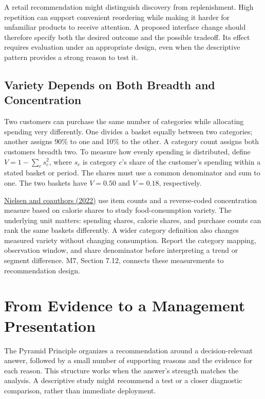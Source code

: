 A retail recommendation might distinguish discovery from replenishment.
High repetition can support convenient reordering while making it harder
for unfamiliar products to receive attention. A proposed interface
change should therefore specify both the desired outcome and the
possible tradeoff. Its effect requires evaluation under an appropriate
design, even when the descriptive pattern provides a strong reason to
test it.

\hypertarget{M02-variety-depends-on-both-breadth-and-concentration}{%
\subsection{Variety Depends on Both Breadth and
Concentration}\label{M02-variety-depends-on-both-breadth-and-concentration}}

\noindent Two customers can purchase the same number of categories while
allocating spending very differently. One divides a basket equally
between two categories; another assigns 90\% to one and 10\% to the
other. A category count assigns both customers breadth two. To measure
how evenly spending is distributed, define \(V=1-\sum_c s_c^2\), where
\(s_c\) is category \(c\)'s share of the customer's spending within a
stated basket or period. The shares must use a common denominator and
sum to one. The two baskets have \(V=0.50\) and \(V=0.18\),
respectively.

\href{https://doi.org/10.1086/720453}{Nielsen and coauthors (2022)} use
item counts and a reverse-coded concentration measure based on calorie
shares to study food-consumption variety. The underlying unit matters:
spending shares, calorie shares, and purchase counts can rank the same
baskets differently. A wider category definition also changes measured
variety without changing consumption. Report the category mapping,
observation window, and share denominator before interpreting a trend or
segment difference. M7, Section 7.12, connects these measurements to
recommendation design.

\hypertarget{M02-from-evidence-to-a-management-presentation}{%
\section{From Evidence to a Management
Presentation}\label{M02-from-evidence-to-a-management-presentation}}

\noindent The Pyramid Principle organizes a recommendation around a
decision-relevant answer, followed by a small number of supporting
reasons and the evidence for each reason. This structure works when the
answer's strength matches the analysis. A descriptive study might
recommend a test or a closer diagnostic comparison, rather than
immediate deployment.

